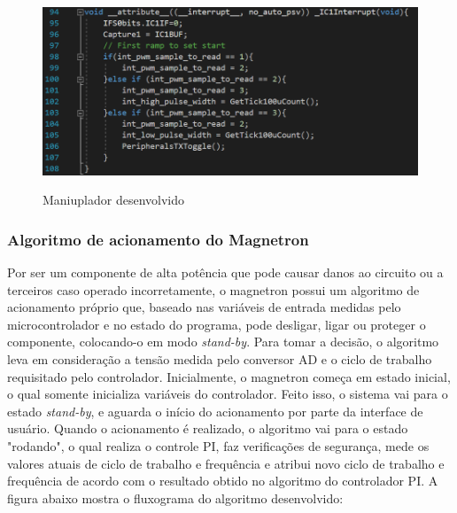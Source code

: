\begin{figure}[H]
    \centering
    \caption{Maniuplador desenvolvido}
    \includegraphics[width=1\textwidth]{./dados/figuras/irq_ic}
    \label{fig:figura-irq_ic}
\end{figure}


\subsubsection{Algoritmo de acionamento do Magnetron}
Por ser um componente de alta potência que pode causar danos ao circuito ou a terceiros caso operado incorretamente, o magnetron possui um algoritmo de acionamento próprio que, baseado nas variáveis de entrada medidas pelo microcontrolador e no estado do programa, pode desligar, ligar ou proteger o componente, colocando-o em modo \textit{stand-by}. Para tomar a decisão, o algoritmo leva em consideração a tensão medida pelo conversor AD e o ciclo de trabalho requisitado pelo controlador. Inicialmente, o magnetron começa em estado inicial, o qual somente inicializa variáveis do controlador. Feito isso, o sistema vai para o estado \textit{stand-by}, e aguarda o início do acionamento por parte da interface de usuário. Quando o acionamento é realizado, o algoritmo vai para o estado "rodando", o qual realiza o controle PI, faz verificações de segurança, mede os valores atuais de ciclo de trabalho e frequência e atribui novo ciclo de trabalho e frequência de acordo com o resultado obtido no algoritmo do controlador PI. A figura abaixo mostra o fluxograma do algoritmo desenvolvido:


